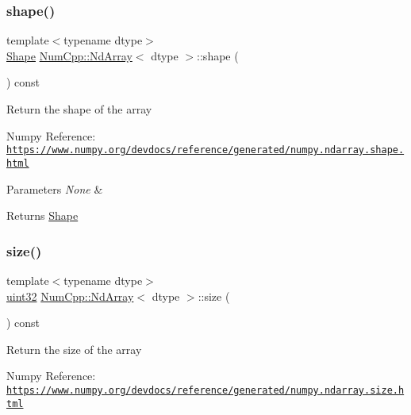 \subsubsection{\texorpdfstring{shape()}{shape()}}
{\footnotesize\ttfamily template$<$typename dtype$>$ \\
\mbox{\hyperlink{class_num_cpp_1_1_shape}{Shape}} \mbox{\hyperlink{class_num_cpp_1_1_nd_array}{Num\+Cpp\+::\+Nd\+Array}}$<$ dtype $>$\+::shape (\begin{DoxyParamCaption}{ }\end{DoxyParamCaption}) const\hspace{0.3cm}{\ttfamily [inline]}}

Return the shape of the array

Numpy Reference\+: \href{https://www.numpy.org/devdocs/reference/generated/numpy.ndarray.shape.html}{\tt https\+://www.\+numpy.\+org/devdocs/reference/generated/numpy.\+ndarray.\+shape.\+html}


\begin{DoxyParams}{Parameters}
{\em None} & \\
\hline
\end{DoxyParams}
\begin{DoxyReturn}{Returns}
\mbox{\hyperlink{class_num_cpp_1_1_shape}{Shape}} 
\end{DoxyReturn}
\mbox{\label{class_num_cpp_1_1_nd_array_a27f831118f52436c1e0810fe6b0b940d}} 
\subsubsection{\texorpdfstring{size()}{size()}}
{\footnotesize\ttfamily template$<$typename dtype$>$ \\
\mbox{\hyperlink{namespace_num_cpp_a36f388e948380413c63011cab9b7fbd5}{uint32}} \mbox{\hyperlink{class_num_cpp_1_1_nd_array}{Num\+Cpp\+::\+Nd\+Array}}$<$ dtype $>$\+::size (\begin{DoxyParamCaption}{ }\end{DoxyParamCaption}) const\hspace{0.3cm}{\ttfamily [inline]}}

Return the size of the array

Numpy Reference\+: \href{https://www.numpy.org/devdocs/reference/generated/numpy.ndarray.size.html}{\tt https\+://www.\+numpy.\+org/devdocs/reference/generated/numpy.\+ndarray.\+size.\+html}


